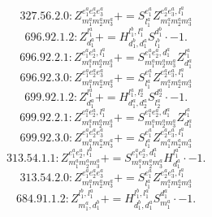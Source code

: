 \documentclass[letterpaper,10pt,fleqn,leqno,onecolumn]{article}
\begin{document}
\begin{equation} \;\;\;\;\;\;  327.56.2.0: Z^{e_{1}^{a}e_{2}^{a}e_{3}^{a}}_{m_{1}^{a}m_{2}^{a}m_{3}^{a}}+=S^{e_{1}^{a}}_{l_{1}^{a}}Z^{e_{2}^{a}e_{3}^{a},l_{1}^{a}}_{m_{1}^{a}m_{2}^{a}m_{3}^{a}} \end{equation}
\begin{equation} \;\;\;\;\;\;  696.92.1.2: Z^{l_{1}^{a}}_{d_{1}^{a}}+=H^{l_{1}^{b},l_{1}^{a}}_{d_{1}^{b},d_{1}^{a}}S^{d_{1}^{b}}_{l_{1}^{b}}\cdot -1. \end{equation}
\begin{equation} \;\;\;\;\;\;  696.92.2.1: Z^{e_{1}^{a}e_{2}^{a},l_{1}^{a}}_{m_{1}^{a}m_{2}^{a}m_{3}^{a}}+=S^{e_{1}^{a}e_{2}^{a},d_{1}^{a}}_{m_{1}^{a}m_{2}^{a}m_{3}^{a}}Z^{l_{1}^{a}}_{d_{1}^{a}} \end{equation}
\begin{equation} \;\;\;\;\;\;  696.92.3.0: Z^{e_{1}^{a}e_{2}^{a}e_{3}^{a}}_{m_{1}^{a}m_{2}^{a}m_{3}^{a}}+=S^{e_{1}^{a}}_{l_{1}^{a}}Z^{e_{2}^{a}e_{3}^{a},l_{1}^{a}}_{m_{1}^{a}m_{2}^{a}m_{3}^{a}} \end{equation}
\begin{equation} \;\;\;\;\;\;  699.92.1.2: Z^{l_{1}^{a}}_{d_{1}^{a}}+=H^{l_{1}^{a},l_{2}^{a}}_{d_{1}^{a},d_{2}^{a}}S^{d_{2}^{a}}_{l_{2}^{a}}\cdot -1. \end{equation}
\begin{equation} \;\;\;\;\;\;  699.92.2.1: Z^{e_{1}^{a}e_{2}^{a},l_{1}^{a}}_{m_{1}^{a}m_{2}^{a}m_{3}^{a}}+=S^{e_{1}^{a}e_{2}^{a},d_{1}^{a}}_{m_{1}^{a}m_{2}^{a}m_{3}^{a}}Z^{l_{1}^{a}}_{d_{1}^{a}} \end{equation}
\begin{equation} \;\;\;\;\;\;  699.92.3.0: Z^{e_{1}^{a}e_{2}^{a}e_{3}^{a}}_{m_{1}^{a}m_{2}^{a}m_{3}^{a}}+=S^{e_{1}^{a}}_{l_{1}^{a}}Z^{e_{2}^{a}e_{3}^{a},l_{1}^{a}}_{m_{1}^{a}m_{2}^{a}m_{3}^{a}} \end{equation}
\begin{equation} \;\;\;\;\;\;  313.54.1.1: Z^{e_{1}^{a}e_{2}^{a},l_{1}^{a}}_{m_{1}^{a}m_{2}^{a}m_{3}^{a}}+=S^{e_{1}^{a}e_{2}^{a},d_{1}^{a}}_{m_{1}^{a}m_{2}^{a}m_{3}^{a}}H^{l_{1}^{a}}_{d_{1}^{a}}\cdot -1. \end{equation}
\begin{equation} \;\;\;\;\;\;  313.54.2.0: Z^{e_{1}^{a}e_{2}^{a}e_{3}^{a}}_{m_{1}^{a}m_{2}^{a}m_{3}^{a}}+=S^{e_{1}^{a}}_{l_{1}^{a}}Z^{e_{2}^{a}e_{3}^{a},l_{1}^{a}}_{m_{1}^{a}m_{2}^{a}m_{3}^{a}} \end{equation}
\begin{equation} \;\;\;\;\;\;  684.91.1.2: Z^{l_{1}^{b},l_{1}^{a}}_{m_{1}^{a},d_{1}^{b}}+=H^{l_{1}^{b},l_{1}^{a}}_{d_{1}^{b},d_{1}^{a}}S^{d_{1}^{a}}_{m_{1}^{a}}\cdot -1. \end{equation}
\end{document}
